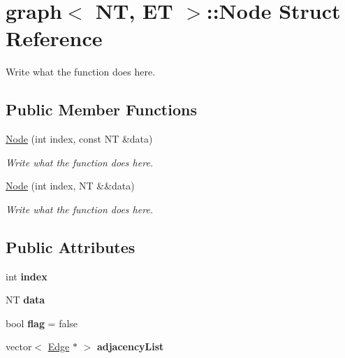 \hypertarget{structgraph_1_1Node}{\section{graph$<$ N\+T, E\+T $>$\+:\+:Node Struct Reference}
\label{structgraph_1_1Node}
}


Write what the function does here.  


\subsection*{Public Member Functions}
\begin{DoxyCompactItemize}
\item 
\hyperlink{structgraph_1_1Node_a2ea59c8e60a21337707a4724ec2187c3}{Node} (int index, const N\+T \&data)
\begin{DoxyCompactList}\small\item\em Write what the function does here. \end{DoxyCompactList}\item 
\hyperlink{structgraph_1_1Node_a00ae7db8b8befe0e81b08dc6da311ce4}{Node} (int index, N\+T \&\&data)
\begin{DoxyCompactList}\small\item\em Write what the function does here. \end{DoxyCompactList}\end{DoxyCompactItemize}
\subsection*{Public Attributes}
\begin{DoxyCompactItemize}
\item 
\hypertarget{structgraph_1_1Node_ab4a666688dbafdca1b669513bc44f426}{int {\bfseries index}}\label{structgraph_1_1Node_ab4a666688dbafdca1b669513bc44f426}

\item 
\hypertarget{structgraph_1_1Node_adc94dabc0af744a6715917606e9cc0d5}{N\+T {\bfseries data}}\label{structgraph_1_1Node_adc94dabc0af744a6715917606e9cc0d5}

\item 
\hypertarget{structgraph_1_1Node_a4b9b756169b675dfae4084567abe6293}{bool {\bfseries flag} = false}\label{structgraph_1_1Node_a4b9b756169b675dfae4084567abe6293}

\item 
\hypertarget{structgraph_1_1Node_abfdd0522b2b424059fa50c10616353d1}{vector$<$ \hyperlink{structgraph_1_1Edge}{Edge} $\ast$ $>$ {\bfseries adjacency\+List}}\label{structgraph_1_1Node_abfdd0522b2b424059fa50c10616353d1}

\end{DoxyCompactItemize}


